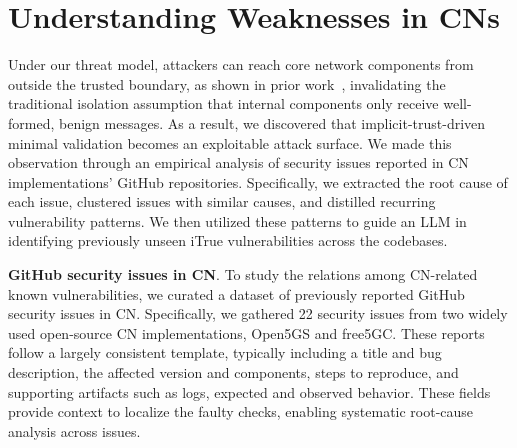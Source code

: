 \section{Understanding Weaknesses in CNs}

Under our threat model, attackers can reach core network components from outside the trusted boundary, as shown in prior work~\cite{zhang2025invade}, invalidating the traditional isolation assumption that internal components only receive well-formed, benign messages. As a result, we discovered that implicit-trust-driven minimal validation becomes an exploitable attack surface. We made this observation through an empirical analysis of security issues reported in CN implementations’ GitHub repositories. Specifically, we extracted the root cause of each issue, clustered issues with similar causes, and distilled recurring vulnerability patterns. We then utilized these patterns to guide an LLM in identifying previously unseen iTrue vulnerabilities across the codebases.

\noindent\textbf{GitHub security issues in CN}. 
To study the relations among CN-related known vulnerabilities, we curated a dataset of previously reported GitHub security issues in CN. Specifically, we gathered 22 security issues from two widely used open-source CN implementations, Open5GS and free5GC. These reports follow a largely consistent template, typically including a title and bug description, the affected version and components, steps to reproduce, and supporting artifacts such as logs, expected and observed behavior.
These fields provide context to localize the faulty checks, enabling systematic root-cause analysis across issues.


